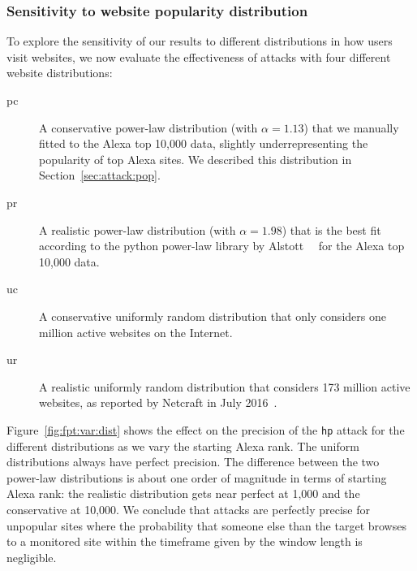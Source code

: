 
\subsubsection{Sensitivity to website popularity distribution}

To explore the sensitivity of our results to different distributions in
how users visit websites, we now evaluate the effectiveness of \name
attacks with four different website distributions:
\begin{description}
	\item[pc] A conservative power-law distribution
	(with $\alpha=1.13$)
	that we manually fitted to the Alexa top 10,000 data,
	slightly underrepresenting the popularity of top Alexa sites.
	We described this distribution in Section~\ref{sec:attack:pop}.
	\item[pr] A realistic power-law distribution
	(with $\alpha=1.98$)
	that is the best fit according to
	the python power-law library by Alstott~\ea~\cite{power-law} for the Alexa
	top 10,000 data.
	\item[uc] A conservative uniformly random distribution that
	only considers one million active websites on the Internet.
	\item[ur] A realistic uniformly random distribution that
          considers 173 million active websites, as reported by Netcraft
          in July 2016~\cite{numberofwebsites}.
\end{description}
Figure~\ref{fig:fpt:var:dist} shows the effect on the precision of the
\texttt{hp} attack for the different distributions as we vary the starting
Alexa rank. The uniform distributions always have perfect precision.
The difference between the two power-law distributions is about one order of
magnitude in terms of starting Alexa rank: the realistic distribution gets
near perfect at 1,000 and the conservative at 10,000.
We conclude that \name attacks are perfectly precise for unpopular sites
where the probability that someone else than the target browses to a monitored
site within the timeframe given by the window length is negligible.
